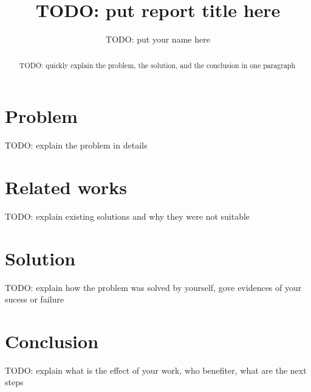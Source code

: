 \documentclass[acmlarge, screen, nonacm]{acmart}
\title{TODO: put report title here}
\author{TODO: put your name here}
\begin{document}
\begin{abstract}
TODO: quickly explain the problem, the solution, and the conclusion in one paragraph
\end{abstract}

\maketitle

\section{Problem}

TODO: explain the problem in details

\section{Related works}

TODO: explain existing solutions and why they were not suitable

\section{Solution}

TODO: explain how the problem was solved by yourself, gove evidences of your sucess or failure

\section{Conclusion}

TODO: explain what is the effect of your work, who benefiter, what are the next steps
\end{document}
